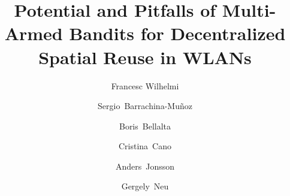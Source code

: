 \documentclass[preprint,12pt]{elsarticle}
\begin{document}
\begin{frontmatter}



\title{Potential and Pitfalls of Multi-Armed Bandits for Decentralized Spatial Reuse in WLANs}

\author[label1]{Francesc Wilhelmi } %
\author[label1]{Sergio~Barrachina-Mu\~noz}
\author[label1]{Boris~Bellalta} \author[label2]{Cristina~Cano}
\author[label3]{Anders~Jonsson}
\author[label3]{Gergely~Neu}
\address[label1]{Wireless Networking Research Group (WN-UPF), 08002 Barcelona, Spain}
\address[label2]{Wireless Networks Research Group (WINE-UOC), 08860 Castelldefels (Barelona), Spain}
\address[label3]{Artificial Intelligence and Machine Learning Research Group (AIML-UPF), 08002 Barcelona, Spain}


\end{frontmatter}
\end{document}
